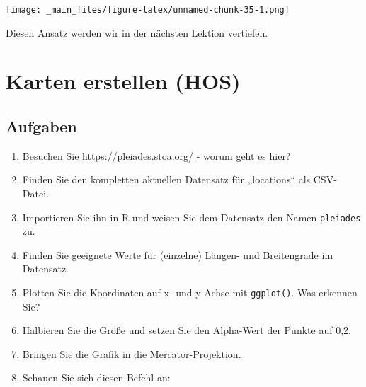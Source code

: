 \documentclass[11pt,german,a4paper]{article}
\begin{document}
\texttt{[image: \_main\_files/figure-latex/unnamed-chunk-35-1.png]}

Diesen Ansatz werden wir in der nächsten Lektion vertiefen.

\hypertarget{karten-erstellen-hos}{%
\section{Karten erstellen (HOS)}\label{karten-erstellen-hos}}

\hypertarget{aufgaben-1}{%
\subsection{Aufgaben}\label{aufgaben-1}}

\begin{enumerate}
\def\labelenumi{\arabic{enumi}.}
\item
  Besuchen Sie \url{https://pleiades.stoa.org/} - worum geht es hier?
\item
  Finden Sie den kompletten aktuellen Datensatz für „locations`` als CSV-Datei.
\item
  Importieren Sie ihn in R und weisen Sie dem Datensatz den Namen \texttt{pleiades} zu.
\item
  Finden Sie geeignete Werte für (einzelne) Längen- und Breitengrade im Datensatz.
\item
  Plotten Sie die Koordinaten auf x- und y-Achse mit \texttt{ggplot()}. Was erkennen Sie?
\item
  Halbieren Sie die Größe und setzen Sie den Alpha-Wert der Punkte auf 0,2.
\item
  Bringen Sie die Grafik in die Mercator-Projektion.
\item
  Schauen Sie sich diesen Befehl an:


\end{enumerate}
\end{document}
